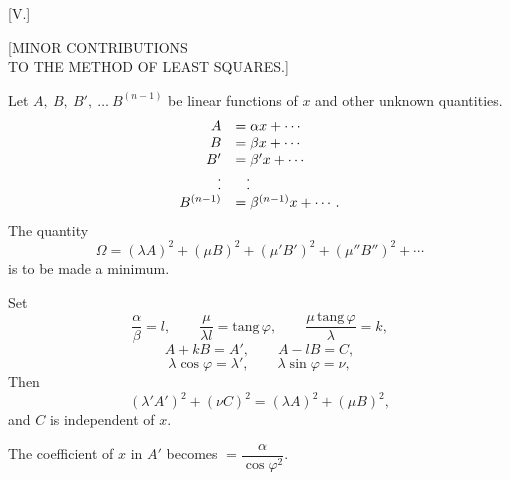 \clearpage
{}
\begin{center}
[V.]

{\large [MINOR CONTRIBUTIONS\\
TO THE METHOD OF LEAST SQUARES.]}
\end{center}



Let $A,\ B,\ B',\ \ldots\ B^{(n-1)}$ be linear functions of $x$ and other unknown quantities.
\[
\begin{array}{rl}
A&=\alpha x+\cdots\\
B&=\beta x+\cdots\\
B'&=\beta' x+\cdots\\
.&\hphantom{=} .\\[-.6em]
.&\hphantom{=} .\\
B^{(n-1)}&=\beta^{(n-1)}x+\cdots.
\end{array}
\]
The quantity
\[
\Omega = (\lambda A)^2+(\mu B)^2+(\mu' B')^2+(\mu'' B'')^2+\cdots
\]
is to be made a minimum.

Set
\[
\frac{\alpha}{\beta}=l,\qquad \frac{\mu}{\lambda l}=\mathrm{tang}\,\varphi,\qquad
\frac{\mu\,\mathrm{tang}\,\varphi}{\lambda}=k,
\]
\[
A+kB=A',\qquad A-lB=C,
\]
\[
\lambda\cos\varphi=\lambda',\qquad \lambda\sin\varphi=\nu,
\]
Then
\[
(\lambda' A')^2+(\nu C)^2=(\lambda A)^2+(\mu B)^2,
\]
and $C$ is independent of $x$.

The coefficient of $x$ in $A'$ becomes $=\dfrac{\alpha}{\cos\varphi^2}$.

